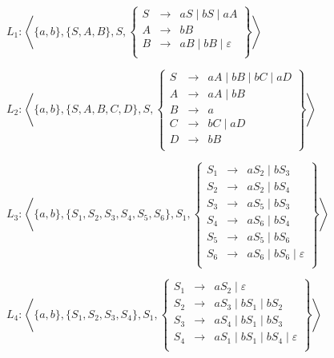 \begin{corrections}
  
  \begin{questions}
  \item $L_1 : \left\langle \{a, b\}, \{S, A, B\}, S,
    \left\{\begin{array}{lll}
    S   &\rightarrow& a S \mid b S \mid a A\\
    A   &\rightarrow& b B\\
    B   &\rightarrow& a B \mid b B \mid \varepsilon\\
    \end{array}\right\}\right\rangle$

  \item $L_2 : \left\langle \{a, b\}, \{S, A, B, C, D\}, S,
    \left\{\begin{array}{lll}
    S   &\rightarrow& a A \mid b B \mid b C \mid a D\\
    A   &\rightarrow& a A \mid b B\\
    B   &\rightarrow& a \\
    C   &\rightarrow& b C \mid a D\\
    D   &\rightarrow& b B\\
    \end{array}\right\}\right\rangle$

  \item $L_3 : \left\langle \{a, b\}, \{S_1, S_2, S_3, S_4, S_5, S_6\}, S_1,
    \left\{\begin{array}{lll}
    S_1   &\rightarrow& a S_2 \mid b S_3\\
    S_2   &\rightarrow& a S_2 \mid b S_4\\
    S_3   &\rightarrow& a S_5 \mid b S_3\\
    S_4   &\rightarrow& a S_6 \mid b S_4\\
    S_5   &\rightarrow& a S_5 \mid b S_6\\
    S_6   &\rightarrow& a S_6 \mid b S_6 \mid \varepsilon\\
    \end{array}\right\}\right\rangle$

  \item $L_4 : \left\langle \{a, b\}, \{S_1, S_2, S_3, S_4\}, S_1,
    \left\{\begin{array}{lll}
    S_1   &\rightarrow& a S_2 \mid \varepsilon\\
    S_2   &\rightarrow& a S_3 \mid b S_1 \mid b S_2\\
    S_3   &\rightarrow& a S_4 \mid b S_1 \mid b S_3\\
    S_4   &\rightarrow& a S_1 \mid b S_1 \mid b S_4 \mid \varepsilon\\
    \end{array}\right\}\right\rangle$

  \end{questions}
  
\end{corrections}

\endgroup
\endinput
